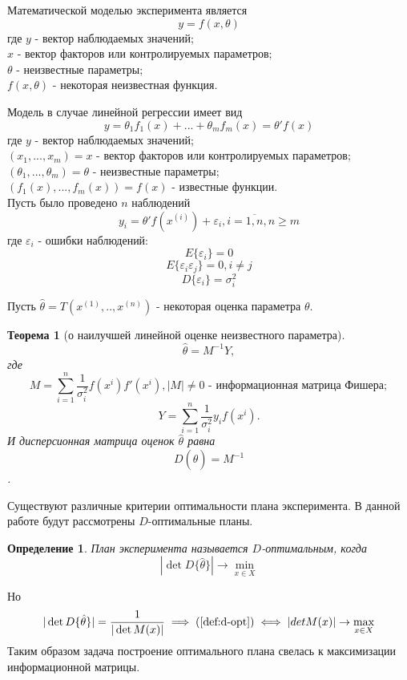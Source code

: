 Математической моделью эксперимента является
\begin{equation}
y = f(x, \theta)  
\end{equation}
где $y$ - вектор наблюдаемых значений;\\
$x$ - вектор факторов или контролируемых параметров;\\
$\theta$ - неизвестные параметры;\\
$f(x, \theta)$ - некоторая неизвестная функция.

Модель в случае линейной регрессии имеет вид
\begin{equation}
y = \theta_1 f_1(x) +...+ \theta_m f_m(x) = \theta'f(x)
\end{equation}
где $y$ -  вектор наблюдаемых значений;\\
$(x_1,...,x_m)=x$ - вектор факторов или контролируемых параметров;\\
$(\theta_1,...,\theta_m)=\theta$ - неизвестные параметры;\\
$(f_1(x),...,f_m(x))=f(x)$ - известные функции.\\

Пусть было проведено $n$ наблюдений
\begin{equation}
y_i = \theta' f(x^{(i)}) + \varepsilon_i, i = \overline{1, n}, n \ge m
\end{equation}
где $\varepsilon_i$ - ошибки наблюдений:
$$E\{\varepsilon_i\} = 0$$
$$E\{\varepsilon_i \varepsilon_j\} = 0, i \ne j$$
$$D\{\varepsilon_i\}=\sigma_i ^2$$

Пусть $\hat{\theta} =T(x^{(1)},..,x^{(n)}) $ - некоторая оценка параметра $\theta$.\\


\newtheorem{theorem}{Теорема}

\begin{theorem}[о наилучшей линейной оценке неизвестного параметра]
	\begin{equation}
	\hat{\theta} = M^{-1} Y,
	\end{equation}
	где 
	$$M = \sum_{i=1}^{n} \frac{1}{\sigma_i^2}f(x^{i})f'(x^{i}), |M| \ne 0 \text{ - информационная матрица Фишера};$$
	$$Y = \sum_{i=1}^{n}\frac{1}{\sigma_i^2} y_i f(x^{i}).$$
	И дисперсионная матрица оценок $\hat \theta$ равна
	\begin{equation}D(\hat \theta)  = M^{-1}\end{equation}.
\end{theorem}

Существуют различные критерии оптимальности плана эксперимента. В данной работе будут рассмотрены $D$-оптимальные планы.
\newtheorem{definition}{Определение}
\begin{definition}
	План эксперимента называется $D$-оптимальным, когда
	\begin{equation}\label{def:d-opt}
	|\det D\{\hat \theta\} | \rightarrow \min_{x \in X}
	\end{equation}
\end{definition}
Но
\begin{equation}
|\det {D\{\hat \theta\}}| = \frac 1 {|\det M(x)|} \implies (\ref{def:d-opt}) \iff |det M(x)| \rightarrow \max_{x \in X}
\end{equation}
Таким образом задача построение оптимального плана свелась к максимизации информационной матрицы.

